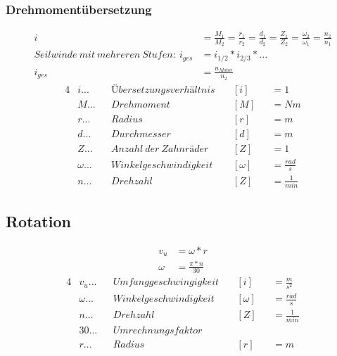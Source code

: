 \documentclass[12pt]{article}
\begin{document}
			\subsubsection{Drehmomentübersetzung}
				\begin{align*}
					i       &= \frac{M_1}{M_2} = \frac{r_1}{r_2} = \frac{d_1}{d_2} = \frac{Z_1}{Z_2} = \frac{\omega_2}{\omega_1} = \frac{n_2}{n_1} \\
					Seilwinde\ mit\ mehreren\ Stufen:\ i_{ges} &= i_{1/2} * i_{2/3} * ... \\
					i_{ges} &= \frac{n_{Motor}}{n_2}
				\end{align*}
				\begin{alignat*}{4}
					&i      ...&&Übersetzungsverhältnis &&\ [i]      &&= 1 \\
					&M      ...&&Drehmoment             &&\ [M]      &&= Nm \\
					&r      ...&&Radius                 &&\ [r]      &&= m \\
					&d      ...&&Durchmesser            &&\ [d]      &&= m \\
					&Z      ...&&Anzahl\ der\ Zahnräder &&\ [Z]      &&= 1 \\
					&\omega ...&&Winkelgeschwindigkeit  &&\ [\omega] &&= \frac{rad}{s} \\
					&n      ...&&Drehzahl               &&\ [Z]      &&= \frac{1}{min}
				\end{alignat*}

		\subsection{Rotation}
			\begin{align*}
				v_u    &= \omega * r \\
				\omega &= \frac{\pi * n}{30}
			\end{align*}
			\begin{alignat*}{4}
				&v_u    ...&&Umfanggeschwingigkeit &&\ [i]      &&= \frac{m}{s^2} \\
				&\omega ...&&Winkelgeschwindigkeit &&\ [\omega] &&= \frac{rad}{s} \\
				&n      ...&&Drehzahl              &&\ [Z]      &&= \frac{1}{min} \\
				&30     ...&&Umrechnungsfaktor     &&\          && \\
				&r      ...&&Radius                &&\ [r]      &&= m
			\end{alignat*}
\end{document}
